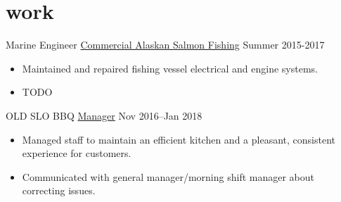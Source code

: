 
\section{work}

\begin{entrylist}


\entry
{Marine Engineer}
{\href{}{Commercial Alaskan Salmon Fishing}}
{Summer 2015-2017}
{\begin{itemize}
\item Maintained and repaired fishing vessel electrical and engine systems.
\item TODO
\end{itemize}}


\entry
{OLD SLO BBQ}
{\href{}{Manager}}
{Nov 2016--Jan 2018}
{\begin{itemize}
\item Managed staff to maintain an efficient kitchen and a pleasant, consistent experience for customers.
\item Communicated with general manager/morning shift manager about correcting issues.
\end{itemize}}



\end{entrylist}

